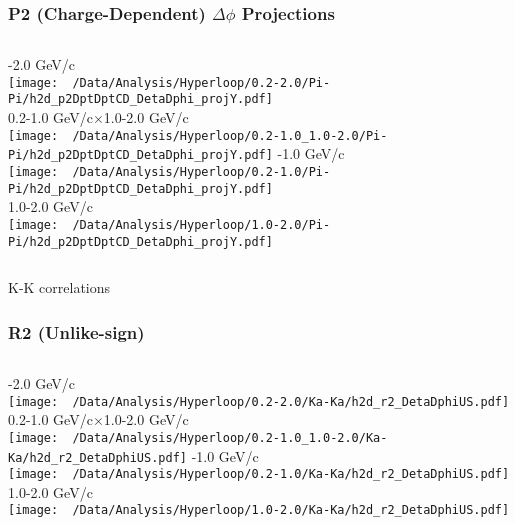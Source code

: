 \documentclass{beamer}
\begin{document}
\begin{frame}
	\frametitle{P2 (Charge-Dependent) $\Delta\phi$ Projections}
	\begin{columns}
		-2.0 GeV/c\\
		\texttt{[image: ~/Data/Analysis/Hyperloop/0.2-2.0/Pi-Pi/h2d\_p2DptDptCD\_DetaDphi\_projY.pdf]}\\0.2-1.0 GeV/c$\times$1.0-2.0 GeV/c\\
		\texttt{[image: ~/Data/Analysis/Hyperloop/0.2-1.0\_1.0-2.0/Pi-Pi/h2d\_p2DptDptCD\_DetaDphi\_projY.pdf]}
		-1.0 GeV/c\\
		\texttt{[image: ~/Data/Analysis/Hyperloop/0.2-1.0/Pi-Pi/h2d\_p2DptDptCD\_DetaDphi\_projY.pdf]}\\1.0-2.0 GeV/c\\
		\texttt{[image: ~/Data/Analysis/Hyperloop/1.0-2.0/Pi-Pi/h2d\_p2DptDptCD\_DetaDphi\_projY.pdf]}
	\end{columns}
\end{frame}
\begin{frame}
	\LARGE K-K correlations
\end{frame}
\begin{frame}
	\frametitle{R2 (Unlike-sign)}
	\begin{columns}
		\column{0.5\textwidth}
		-2.0 GeV/c\\
		\texttt{[image: ~/Data/Analysis/Hyperloop/0.2-2.0/Ka-Ka/h2d\_r2\_DetaDphiUS.pdf]}\\0.2-1.0 GeV/c$\times$1.0-2.0 GeV/c\\
		\texttt{[image: ~/Data/Analysis/Hyperloop/0.2-1.0\_1.0-2.0/Ka-Ka/h2d\_r2\_DetaDphiUS.pdf]}
		\column{0.5\textwidth}
		-1.0 GeV/c\\
		\texttt{[image: ~/Data/Analysis/Hyperloop/0.2-1.0/Ka-Ka/h2d\_r2\_DetaDphiUS.pdf]}\\1.0-2.0 GeV/c\\
		\texttt{[image: ~/Data/Analysis/Hyperloop/1.0-2.0/Ka-Ka/h2d\_r2\_DetaDphiUS.pdf]}
	\end{columns}
\end{frame}
\end{document}
